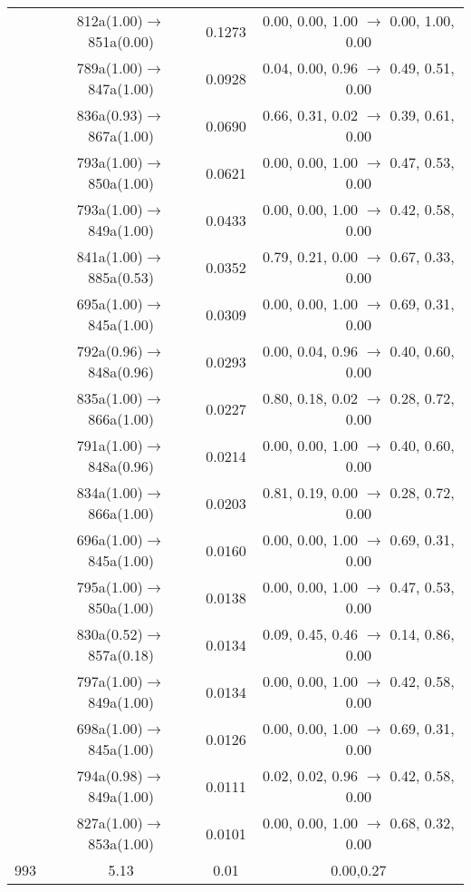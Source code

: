 \documentclass[10pt,a4paper]{article}
\begin{document}
\begin{longtable}{c|c|c|c}
 	& 812a(1.00)$\rightarrow$851a(0.00) &	 0.1273 &	 0.00, 0.00, 1.00 $\rightarrow$ 0.00, 1.00, 0.00 \\ 
 	& 789a(1.00)$\rightarrow$847a(1.00) &	 0.0928 &	 0.04, 0.00, 0.96 $\rightarrow$ 0.49, 0.51, 0.00 \\ 
 	& 836a(0.93)$\rightarrow$867a(1.00) &	 0.0690 &	 0.66, 0.31, 0.02 $\rightarrow$ 0.39, 0.61, 0.00 \\ 
 	& 793a(1.00)$\rightarrow$850a(1.00) &	 0.0621 &	 0.00, 0.00, 1.00 $\rightarrow$ 0.47, 0.53, 0.00 \\ 
 	& 793a(1.00)$\rightarrow$849a(1.00) &	 0.0433 &	 0.00, 0.00, 1.00 $\rightarrow$ 0.42, 0.58, 0.00 \\ 
 	& 841a(1.00)$\rightarrow$885a(0.53) &	 0.0352 &	 0.79, 0.21, 0.00 $\rightarrow$ 0.67, 0.33, 0.00 \\ 
 	& 695a(1.00)$\rightarrow$845a(1.00) &	 0.0309 &	 0.00, 0.00, 1.00 $\rightarrow$ 0.69, 0.31, 0.00 \\ 
 	& 792a(0.96)$\rightarrow$848a(0.96) &	 0.0293 &	 0.00, 0.04, 0.96 $\rightarrow$ 0.40, 0.60, 0.00 \\ 
 	& 835a(1.00)$\rightarrow$866a(1.00) &	 0.0227 &	 0.80, 0.18, 0.02 $\rightarrow$ 0.28, 0.72, 0.00 \\ 
 	& 791a(1.00)$\rightarrow$848a(0.96) &	 0.0214 &	 0.00, 0.00, 1.00 $\rightarrow$ 0.40, 0.60, 0.00 \\ 
 	& 834a(1.00)$\rightarrow$866a(1.00) &	 0.0203 &	 0.81, 0.19, 0.00 $\rightarrow$ 0.28, 0.72, 0.00 \\ 
 	& 696a(1.00)$\rightarrow$845a(1.00) &	 0.0160 &	 0.00, 0.00, 1.00 $\rightarrow$ 0.69, 0.31, 0.00 \\ 
 	& 795a(1.00)$\rightarrow$850a(1.00) &	 0.0138 &	 0.00, 0.00, 1.00 $\rightarrow$ 0.47, 0.53, 0.00 \\ 
 	& 830a(0.52)$\rightarrow$857a(0.18) &	 0.0134 &	 0.09, 0.45, 0.46 $\rightarrow$ 0.14, 0.86, 0.00 \\ 
 	& 797a(1.00)$\rightarrow$849a(1.00) &	 0.0134 &	 0.00, 0.00, 1.00 $\rightarrow$ 0.42, 0.58, 0.00 \\ 
 	& 698a(1.00)$\rightarrow$845a(1.00) &	 0.0126 &	 0.00, 0.00, 1.00 $\rightarrow$ 0.69, 0.31, 0.00 \\ 
 	& 794a(0.98)$\rightarrow$849a(1.00) &	 0.0111 &	 0.02, 0.02, 0.96 $\rightarrow$ 0.42, 0.58, 0.00 \\ 
 	& 827a(1.00)$\rightarrow$853a(1.00) &	 0.0101 &	 0.00, 0.00, 1.00 $\rightarrow$ 0.68, 0.32, 0.00 \\ 
 \hline993 &	 5.13 &	 0.01 &	 0.00,0.27 \\ 

\end{longtable}
\end{document}

